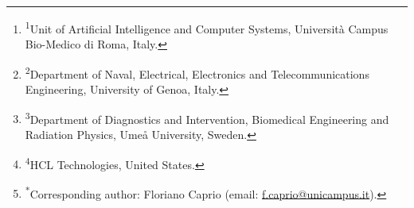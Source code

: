 \author{Floriano~Caprio\textsuperscript{*,1},
        Matteo~Tortora\textsuperscript{2},
        Paolo~Soda\textsuperscript{1,3},
        and~Sunil~Gentyala\textsuperscript{4}%
\thanks{\textsuperscript{1}Unit of Artificial Intelligence and Computer Systems, Universit\`a Campus Bio-Medico di Roma, Italy.}%
\thanks{\textsuperscript{2}Department of Naval, Electrical, Electronics and Telecommunications Engineering, University of Genoa, Italy.}%
\thanks{\textsuperscript{3}Department of Diagnostics and Intervention, Biomedical Engineering and Radiation Physics, Ume\aa{} University, Sweden.}%
\thanks{\textsuperscript{4}HCL Technologies, United States.}%
\thanks{\textsuperscript{*}Corresponding author: Floriano Caprio (email: \href{mailto:f.caprio@unicampus.it}{f.caprio@unicampus.it}).}}
